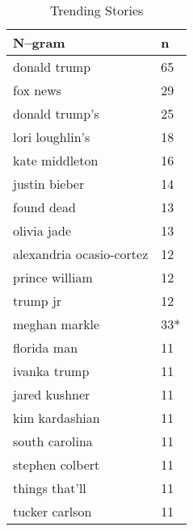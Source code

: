 \begin{table}[!t]
\small
    \begin{subtable}{0.25 \textwidth}
      \centering
        \caption{Trending Stories}
        \begin{tabular}{@{}ll@{}}
            \toprule
            N--gram    & n \\
            \midrule
donald trump     & 65     \\
fox news     & 29     \\
donald trump's     & 25     \\
lori loughlin's     & 18     \\
kate middleton     & 16     \\
justin bieber     & 14    \\
found dead     & 13     \\
olivia jade     & 13      \\
alexandria ocasio-cortez     & 12     \\
prince william     & 12       \\
trump jr    & 12      \\
meghan markle     & 33*      \\
florida man     & 11     \\
ivanka trump     & 11      \\
jared kushner     & 11       \\
kim kardashian     & 11       \\
south carolina     & 11      \\
stephen colbert     & 11      \\
things that'll     & 11     \\
tucker carlson     & 11     \\


\end{tabular}
\end{subtable}
\end{table}
